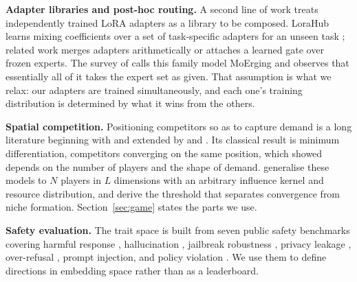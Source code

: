 \documentclass{article}
\begin{document}
\textbf{Adapter libraries and post-hoc routing.} A second line of work treats independently trained
LoRA adapters as a library to be composed. LoraHub learns mixing coefficients over a set of
task-specific adapters for an unseen task \citep{huang2024lorahub}; related work merges adapters
arithmetically \citep{ilharco2023task} or attaches a learned gate over frozen experts. The survey of
\citet{yadav2024moerging} calls this family model MoErging and observes that essentially all of it
takes the expert set as given. That assumption is what we relax: our adapters are trained
simultaneously, and each one's training distribution is determined by what it wins from the others.

\textbf{Spatial competition.} Positioning competitors so as to capture demand is a long literature
beginning with \citet{hotelling1929stability} and extended by \citet{salop1979monopolistic} and
\citet{downs1957economic}. Its classical result is minimum differentiation, competitors converging on
the same position, which \citet{eaton1975principle} showed depends on the number of players and the
shape of demand. \citet{lovett2026influencer} generalise these models to $N$ players in $L$
dimensions with an arbitrary influence kernel and resource distribution, and derive the threshold
that separates convergence from niche formation. Section~\ref{sec:game} states the parts we use.

\textbf{Safety evaluation.} The trait space is built from seven public safety benchmarks covering
harmful response \citep{ji2023beavertails}, hallucination \citep{li2023halueval}, jailbreak
robustness \citep{chao2024jailbreakbench}, privacy leakage \citep{ai4privacy2023}, over-refusal
\citep{cui2024orbench}, prompt injection, and policy violation \citep{wang2023donotanswer}. We use
them to define directions in embedding space rather than as a leaderboard.
\end{document}
